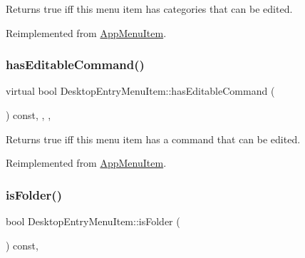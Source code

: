 \begin{DoxyReturn}{Returns}
true iff this menu item has categories that can be edited. 
\end{DoxyReturn}


Reimplemented from \mbox{\hyperlink{classAppMenuItem_aa9656d7c1a2dd93bd02f119c0efbb2e0}{App\+Menu\+Item}}.

\mbox{\label{classDesktopEntryMenuItem_a60ed757bf4ebe33537b7204d005ecc78}} 
\subsubsection{\texorpdfstring{has\+Editable\+Command()}{hasEditableCommand()}}
{\footnotesize\ttfamily virtual bool Desktop\+Entry\+Menu\+Item\+::has\+Editable\+Command (\begin{DoxyParamCaption}{ }\end{DoxyParamCaption}) const\hspace{0.3cm}{\ttfamily [inline]}, {\ttfamily [override]}, {\ttfamily [protected]}, {\ttfamily [virtual]}}

\begin{DoxyReturn}{Returns}
true iff this menu item has a command that can be edited. 
\end{DoxyReturn}


Reimplemented from \mbox{\hyperlink{classAppMenuItem_a295fde428e713a8c891dc19b5048c373}{App\+Menu\+Item}}.

\mbox{\label{classDesktopEntryMenuItem_aad1d7a68badcde44cd25344e3b8382ab}} 
\subsubsection{\texorpdfstring{is\+Folder()}{isFolder()}}
{\footnotesize\ttfamily bool Desktop\+Entry\+Menu\+Item\+::is\+Folder (\begin{DoxyParamCaption}{ }\end{DoxyParamCaption}) const\hspace{0.3cm}{\ttfamily [override]}, {\ttfamily [virtual]}}

